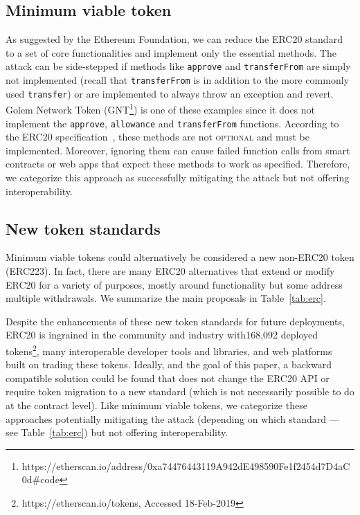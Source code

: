 \subsection{Minimum viable token}

As suggested by the Ethereum Foundation\cite{Ref05}, we can reduce the ERC20 standard to a set of core functionalities and implement only the essential methods. The attack can be side-stepped if methods like \texttt{approve} and \texttt{transferFrom} are simply not implemented (recall that \texttt{transferFrom} is in addition to the more commonly used \texttt{transfer}) or are implemented to always throw an exception and revert. Golem Network Token (GNT\footnote{https://etherscan.io/address/0xa74476443119A942dE498590Fe1f2454d7\newline D4aC0d\#code}) is one of these examples since it does not implement the \texttt{approve}, \texttt{allowance} and \texttt{transferFrom} functions. According to the ERC20 specification~\cite{Ref08}, these methods are not \textsc{optional} and must be implemented. Moreover, ignoring them can cause failed function calls from smart contracts or web apps that expect these methods to work as specified. Therefore, we categorize this approach as successfully mitigating the attack but not offering interoperability.

\subsection{New token standards}

Minimum viable tokens could alternatively be considered a new non-ERC20 token (\cf ERC223). In fact, there are many ERC20 alternatives that extend or modify ERC20 for a variety of purposes, mostly around functionality but some address multiple withdrawals. We summarize the main proposals in Table~\ref{tab:erc}. 

Despite the enhancements of these new token standards for future deployments, ERC20 is ingrained in the community and industry with168,092 deployed tokens\footnote{https://etherscan.io/tokens, Accessed 18-Feb-2019}, many interoperable developer tools and libraries, and web platforms built on trading these tokens. Ideally, and the goal of this paper, a backward compatible solution could be found that does not change the ERC20 API or require token migration to a new standard (which is not necessarily possible to do at the contract level). Like minimum viable tokens, we categorize these approaches potentially mitigating the attack (depending on which standard --- see Table~\ref{tab:erc}) but not offering interoperability.

